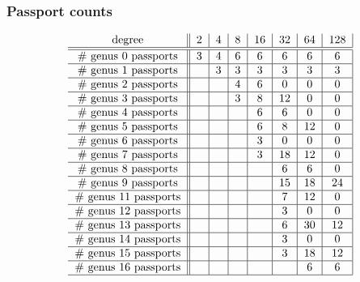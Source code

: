 \documentclass[xcolor=dvipsnames]{beamer}
\theoremstyle{plain}
\begin{document}
  \begin{frame}[plain]
    \frametitle{Passport counts}
    \[
      \begin{tabular}{c||c|c|c|c|c|c|c|}
        degree & $2$ & $4$ & $8$ & $16$ & $32$ & $64$ & $128$\\
        \hline\hline
        \# genus 0 passports & 3 & 4 & 6 & 6 & 6 & 6 & 6 \\
        \hline
        \# genus 1 passports && 3 & 3 & 3 & 3 & 3 & 3 \\
        \hline
        \# genus 2 passports &&& 4 & 6 & 0 & 0 & 0 \\
        \hline
        \# genus 3 passports &&& 3 & 8 & 12 & 0 & 0 \\
        \hline
        \# genus 4 passports &&&& 6 & 6 & 0 & 0 \\
        \hline
        \# genus 5 passports &&&& 6 & 8 & 12 & 0 \\
        \hline
        \# genus 6 passports &&&& 3 & 0 & 0 & 0 \\
        \hline
        \# genus 7 passports &&&& 3 & 18 & 12 & 0 \\
        \hline
        \# genus 8 passports &&&&& 6 & 6 & 0 \\
        \hline
        \# genus 9 passports &&&&& 15 & 18 & 24 \\
        \hline
        \# genus 11 passports &&&&& 7 & 12 & 0 \\
        \hline
        \# genus 12 passports &&&&& 3 & 0 & 0 \\
        \hline
        \# genus 13 passports &&&&& 6 & 30 & 12 \\
        \hline
        \# genus 14 passports &&&&& 3 & 0 & 0 \\
        \hline
        \# genus 15 passports &&&&& 3 & 18 & 12 \\
        \hline
        \# genus 16 passports &&&&&& 6 & 6 \\
        \hline
      \end{tabular}
    \]
  \end{frame}
\end{document}
